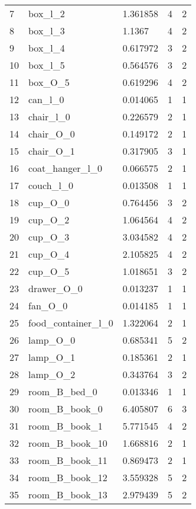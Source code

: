 \begin{longtable}{@{\zz\extracolsep{\fill}} l|llll}
7  & box\_l\_2                & 1.361858 & 4 & 2 \\
8  & box\_l\_3                & 1.1367   & 4 & 2 \\
9  & box\_l\_4                & 0.617972 & 3 & 2 \\
10 & box\_l\_5                & 0.564576 & 3 & 2 \\
11 & box\_O\_5                & 0.619296 & 4 & 2 \\
12 & can\_l\_0                & 0.014065 & 1 & 1 \\
13 & chair\_l\_0              & 0.226579 & 2 & 1 \\
14 & chair\_O\_0              & 0.149172 & 2 & 1 \\
15 & chair\_O\_1              & 0.317905 & 3 & 1 \\
16 & coat\_hanger\_l\_0       & 0.066575 & 2 & 1 \\
17 & couch\_l\_0              & 0.013508 & 1 & 1 \\
18 & cup\_O\_0                & 0.764456 & 3 & 2 \\
19 & cup\_O\_2                & 1.064564 & 4 & 2 \\
20 & cup\_O\_3                & 3.034582 & 4 & 2 \\
21 & cup\_O\_4                & 2.105825 & 4 & 2 \\
22 & cup\_O\_5                & 1.018651 & 3 & 2 \\
23 & drawer\_O\_0             & 0.013237 & 1 & 1 \\
24 & fan\_O\_0                & 0.014185 & 1 & 1 \\
25 & food\_container\_l\_0    & 1.322064 & 2 & 1 \\
26 & lamp\_O\_0               & 0.685341 & 5 & 2 \\
27 & lamp\_O\_1               & 0.185361 & 2 & 1 \\
28 & lamp\_O\_2               & 0.343764 & 3 & 2 \\
29 & room\_B\_bed\_0          & 0.013346 & 1 & 1 \\
30 & room\_B\_book\_0         & 6.405807 & 6 & 3 \\
31 & room\_B\_book\_1         & 5.771545 & 4 & 2 \\
32 & room\_B\_book\_10        & 1.668816 & 2 & 1 \\
33 & room\_B\_book\_11        & 0.869473 & 2 & 1 \\
34 & room\_B\_book\_12        & 3.559328 & 5 & 2 \\
35 & room\_B\_book\_13        & 2.979439 & 5 & 2 \\

\end{longtable}
